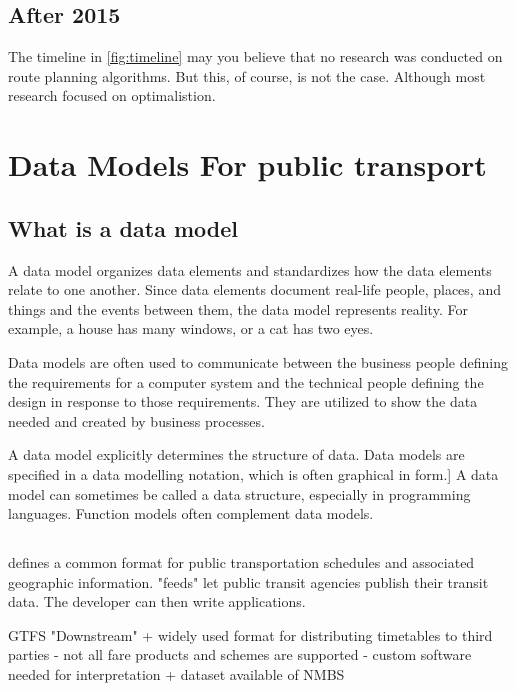 \subsection{After 2015}
The timeline in \autoref{fig:timeline} may you believe that no research was conducted on route planning algorithms. But this, of course, is not the case. Although most research focused on optimalistion.



\section{Data Models For public transport}\label{section:data_model_rel_work}


\subsection{What is a data model }
A data model organizes data elements and standardizes how the data elements relate to one another. Since data elements document real-life people, places, and things and the events between them, the data model represents reality. For example, a house has many windows, or a cat has two eyes.

Data models are often used to communicate between the business people defining the requirements for a computer system and the technical people defining the design in response to those requirements. They are utilized to show the data needed and created by business processes.
 
A data model explicitly determines the structure of data. Data models are specified in a data modelling notation, which is often graphical in form.]
A data model can sometimes be called a data structure, especially in programming languages. Function models often complement data models.
\subsection{}
 defines a common format for public transportation schedules and associated geographic information. "feeds" let public transit agencies publish their transit data. The developer can then write applications.

GTFS
"Downstream" 
+ widely used format for distributing timetables to third
  parties
- not all fare products and schemes are supported
- custom software needed for interpretation 
+ dataset available of NMBS

